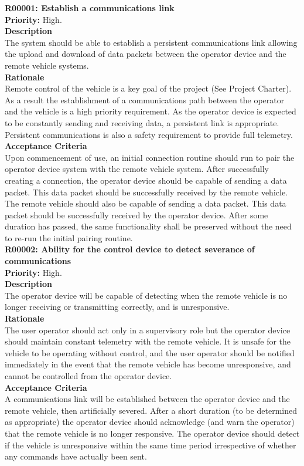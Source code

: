 \documentclass[main.tex]{subfiles}
\begin{document}
\begin{appendices}
\textbf{R00001: Establish a communications link}\\
\textbf{Priority:} High.\\
\textbf{Description}\\
The system should be able to establish a persistent communications link allowing the upload and download of data packets between the operator device and the remote vehicle systems.\\
\textbf{Rationale}\\
Remote control of the vehicle is a key goal of the project (See Project Charter). As a result the establishment of a communications path between the operator and the vehicle is a high priority requirement. As the operator device is expected to be constantly sending and receiving data, a persistent link is appropriate. Persistent communications is also a safety requirement to provide full telemetry.\\
\textbf{Acceptance Criteria}\\
Upon commencement of use, an initial connection routine should run to pair the operator device system with the remote vehicle system. After successfully creating a connection, the operator device should be capable of sending a data packet. This data packet should be successfully received by the remote vehicle. The remote vehicle should also be capable of sending a data packet. This data packet should be successfully received by the operator device. After some duration has passed, the same functionality shall be preserved without the need to re-run the initial pairing routine.\\


\textbf{R00002: Ability for the control device to detect severance of communications}\\
\textbf{Priority:} High.\\
\textbf{Description}\\
The operator device will be capable of detecting when the remote vehicle is no longer receiving or transmitting correctly, and is unresponsive.\\
\textbf{Rationale}\\
The user operator should act only in a supervisory role but the operator device should maintain constant telemetry with the remote vehicle. It is unsafe for the vehicle to be operating without control, and the user operator should be notified immediately in the event that the remote vehicle has become unresponsive, and cannot be controlled from the operator device.\\
\textbf{Acceptance Criteria}\\
A communications link will be established between the operator device and the remote vehicle, then artificially severed. After a short duration (to be determined as appropriate) the operator device should acknowledge (and warn the operator) that the remote vehicle is no longer responsive. The operator device should detect if the vehicle is unresponsive within the same time period irrespective of whether any commands have actually been sent.\\



\end{appendices}
\end{document}
